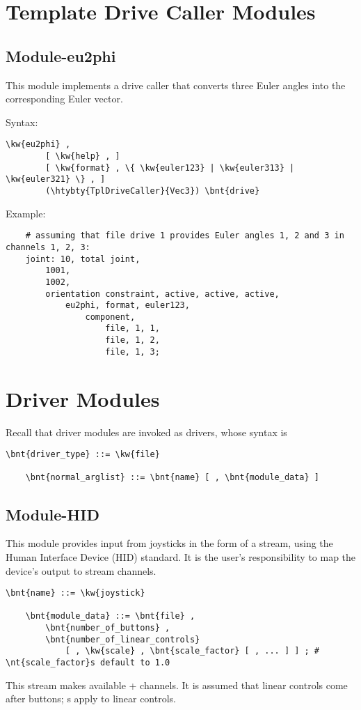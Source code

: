\section{Template Drive Caller Modules}

\subsection{Module-eu2phi}
This module implements a  drive caller
that converts three Euler angles into the corresponding Euler vector.

Syntax:
\begin{Verbatim}[commandchars=\\\{\}]
    \kw{eu2phi} ,
        [ \kw{help} , ]
        [ \kw{format} , \{ \kw{euler123} | \kw{euler313} | \kw{euler321} \} , ]
        (\htybty{TplDriveCaller}{Vec3}) \bnt{drive}
\end{Verbatim}
Example:
\begin{verbatim}
    # assuming that file drive 1 provides Euler angles 1, 2 and 3 in channels 1, 2, 3:
    joint: 10, total joint,
        1001,
        1002,
        orientation constraint, active, active, active,
            eu2phi, format, euler123,
                component,
                    file, 1, 1,
                    file, 1, 2,
                    file, 1, 3;
\end{verbatim}


\section{Driver Modules}
Recall that driver modules are invoked as  drivers,
whose syntax is
\begin{Verbatim}[commandchars=\\\{\}]
    \bnt{driver_type} ::= \kw{file}

    \bnt{normal_arglist} ::= \bnt{name} [ , \bnt{module_data} ]
\end{Verbatim}



\subsection{Module-HID}
This module provides input from joysticks in the form of a stream,
using the Human Interface Device (HID) standard.
It is the user's responsibility to map the device's output to stream channels.

\begin{Verbatim}[commandchars=\\\{\}]
    \bnt{name} ::= \kw{joystick}

    \bnt{module_data} ::= \bnt{file} ,
        \bnt{number_of_buttons} ,
        \bnt{number_of_linear_controls}
            [ , \kw{scale} , \bnt{scale_factor} [ , ... ] ] ; # \nt{scale_factor}s default to 1.0
\end{Verbatim}
This stream makes available  +  channels.
It is assumed that linear controls come after buttons;
s apply to linear controls.

